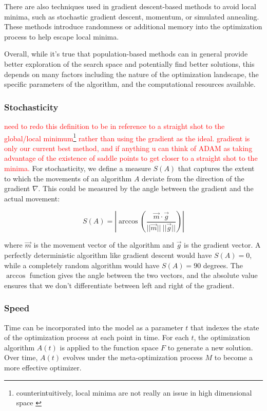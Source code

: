 \documentclass{article}[10pt]
\begin{document}
There are also techniques used in gradient descent-based methods to avoid local minima, such as stochastic gradient descent, momentum, or simulated annealing. 
These methods introduce randomness or additional memory into the optimization process to help escape local minima.\par

Overall, while it's true that population-based methods can in general provide better exploration of the search space and potentially find better solutions, this depends on many factors including the nature of the optimization landscape, the specific parameters of the algorithm, and the computational resources available.\par

\subsubsection{Stochasticity}
\label{subsubsection:stochasticity}
\textcolor{red}{need to redo this definition to be in reference to a straight shot to the global/local minimum\footnote{
    counterintuitively, local minima are not really an issue in high dimensional space \cite{goodfellow2014qualitatively}
} rather than using the gradient as the ideal.
gradient is only our current best method, and if anything u can think of ADAM as taking advantage of the existence of saddle points to get closer to a straight shot to the minima.}
For stochasticity, we define a measure \( S(A) \) that captures the extent to which the movements of an algorithm \( A \) deviate from the direction of the gradient $\nabla$. 
This could be measured by the angle between the gradient and the actual movement:

\[ S(A) = |\arccos(\frac{\vec{m} \cdot \vec{g}}{||\vec{m}|| \ ||\vec{g}||})| \]

where \( \vec{m} \) is the movement vector of the algorithm and \( \vec{g} \) is the gradient vector. 
A perfectly deterministic algorithm like gradient descent would have \( S(A) = 0 \), while a completely random algorithm would have \( S(A) = 90 \) degrees.
The \( \arccos \) function gives the angle between the two vectors, and the absolute value ensures that we don't differentiate between left and right of the gradient.\par

\subsubsection{Speed}
\label{subsubsection:speed}
Time can be incorporated into the model as a parameter \( t \) that indexes the state of the optimization process at each point in time. 
For each \( t \), the optimization algorithm \( A(t) \) is applied to the function space \( F \) to generate a new solution. 
Over time, \( A(t) \) evolves under the meta-optimization process \( M \) to become a more effective optimizer.\par
\end{document}
